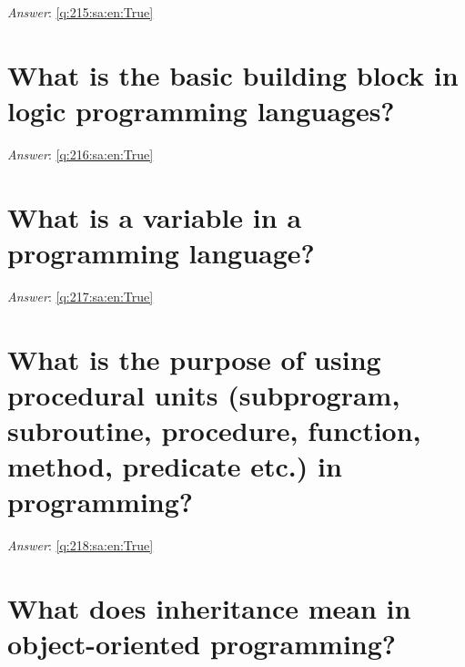 \documentclass[a4paper,11pt,oneside]{book}
\begin{document}
\begin{sloppypar}
\vspace{1cm}

\textit{Answer}: \autoref{q:215:sa:en:True}



\section{What is the basic building block in logic programming languages?}

\label{q:216:sa:en:False}

\vspace{2cm}

\noindent\makebox[\textwidth]{\hrulefill}

\vspace{1cm}

\textit{Answer}: \autoref{q:216:sa:en:True}



\section{What is a variable in a programming language?}

\label{q:217:sa:en:False}

\vspace{2cm}

\noindent\makebox[\textwidth]{\hrulefill}

\vspace{1cm}

\textit{Answer}: \autoref{q:217:sa:en:True}



\section{What is the purpose of using procedural units (subprogram, subroutine, procedure, function, method, predicate etc.) in programming?}

\label{q:218:sa:en:False}

\vspace{2cm}

\noindent\makebox[\textwidth]{\hrulefill}

\vspace{1cm}

\textit{Answer}: \autoref{q:218:sa:en:True}



\section{What does inheritance mean in object-oriented programming?}


\end{sloppypar}
\end{document}
